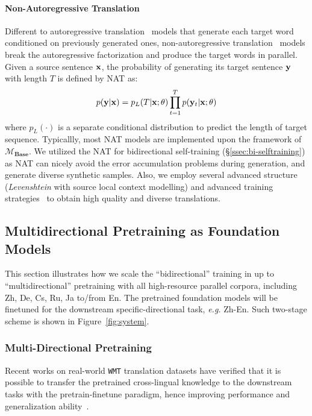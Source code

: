 \documentclass[11pt,a4paper]{article}
\newcommand{\zct}{\color{black}}
\begin{document}
\paragraph{Non-Autoregressive Translation}
Different to autoregressive translation~\cite[AT]{rnnsearch,transformer} models that generate each target word conditioned on previously generated ones, non-autoregressive translation~\cite[NAT]{gu2018non} models break the autoregressive factorization and produce the target words in parallel.
Given a source sentence $\bf x$, the probability of generating its target sentence $\bf y$ with length $T$ is defined by NAT as:
\begin{equation}
    p({\bf y}|{\bf x})=p_L(T|{\bf x}; \theta) \prod_{t=1}^{T}p({\bf y}_t|{\bf x}; \theta)
\end{equation}
where $p_L(\cdot)$ is a separate conditional distribution to predict the length of target sequence. 
Typicallly, most NAT models are implemented upon the framework of $\mathcal{M}_{\textbf{Base}}$.
We utilized {\zct the} NAT for {bidirectional self-training} (\S\ref{ssec:bi-selftraining}) as NAT can nicely avoid the error accumulation problems during generation, and generate diverse synthetic samples. 
Also, we employ several advanced structure~\cite{gu2019levenshtein,ding-etal-2020-context} (\textit{Levenshtein} with source local context modelling) and advanced training strategies~\cite{Ding2020Progressive,Ding2020Rejuvenating,Ding2020UnderstandingAI,ding2022redistributing,ding2022neural} to obtain high quality and diverse translations.

\subsection{Multidirectional Pretraining as Foundation Models}
\label{ssec:foundationmodel}

This section illustrates how we scale the ``bidirectional'' training in \citet{ding2021improving} up to ``multidirectional'' pretraining with all high-resource parallel corpora, including Zh, De, Cs, Ru, Ja to/from En. The pretrained foundation models will be {\zct finetuned for} the downstream specific-directional task, \textit{e.g.} Zh-En. Such two-stage scheme is shown in Figure~\ref{fig:system}.

\subsubsection{Multi-Directional Pretraining}
\label{ssec:multi-pt}
Recent works on real-world \texttt{WMT} translation datasets have verified that {\zct it is possible to transfer} the pretrained cross-lingual knowledge to the downstream tasks with {\zct the} pretrain-finetune paradigm, hence improving performance and generalization ability~\cite{ding2022redistributing, ding2022improving, wang-etal-2020-tencent}.
\end{document}
